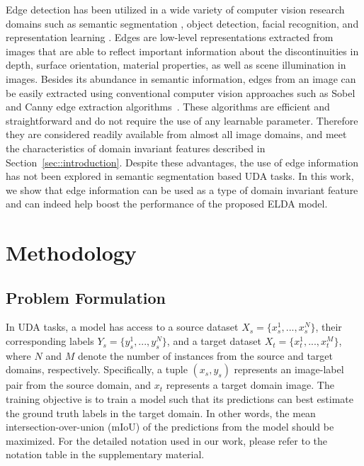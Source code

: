 \documentclass{bmvc2k}
\newcommand{\Xs}{X_s}
\newcommand{\Ys}{Y_s}
\newcommand{\Xt}{X_t}
\newcommand{\xs}{x_s}
\newcommand{\ys}{y_s}
\newcommand{\xt}{x_t}
\begin{document}
Edge detection has been utilized in a wide variety of computer vision research domains such as semantic segmentation \cite{chen2016semantic, JSENet}, object detection\cite{ferrari2007groups, lim2013sketch}, facial recognition\cite{Facial}, and representation learning \cite{chen2020simple}. Edges are low-level representations extracted from images that are able to reflect important information about the discontinuities in depth, surface orientation, material properties, as well as scene illumination in images. Besides its abundance in semantic information, edges from an image can be easily extracted using conventional computer vision approaches such as Sobel~\cite{sobel1998} and Canny edge extraction algorithms~\cite{canny1986}. These algorithms are efficient and straightforward and do not require the use of any learnable parameter. Therefore they are considered readily available from almost all image domains, and meet the characteristics of domain invariant features described in Section~\ref{sec::introduction}.  Despite these advantages, the use of edge information has not been explored in semantic segmentation based UDA tasks. In this work, we show that edge information can be used as a type of domain invariant feature and can indeed help boost the performance of the proposed 
ELDA model.













 


\section{Methodology}
\label{sec::methodology}
\subsection{Problem Formulation}
\label{subsec::problem_formulation}

In UDA tasks, a model has access to a source dataset $\Xs=\{\xs^1, ..., \xs^N\}$, their corresponding labels $\Ys=\{\ys^1, ... , \ys^N\}$, and a target dataset $\Xt = \{\xt^1, ... , \xt^M\}$, where $N$ and $M$ denote the number of instances from the source and target domains, respectively. Specifically, a tuple $(\xs,\ys)$ represents an image-label pair from the source domain, and $\xt$ represents a target domain image. The training objective is to train a model such that its predictions can best estimate the ground truth labels in the target domain. In other words, the mean intersection-over-union (mIoU) of the predictions from the model should be maximized. For the detailed notation used in our work, please refer to the notation table in the supplementary material.
\end{document}
